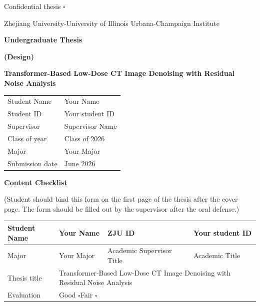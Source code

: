 \documentclass[12pt,a4paper]{report}
\newcommand{\ThesisTitle}{Transformer-Based Low-Dose CT Image Denoising with Residual Noise Analysis}
\newcommand{\StudentName}{Your Name}
\newcommand{\StudentID}{Your student ID}
\newcommand{\SupervisorName}{Supervisor Name}
\newcommand{\SupervisorTitle}{Academic Title}
\newcommand{\ClassYear}{Class of 2026}
\newcommand{\Major}{Your Major}
\newcommand{\SubmissionDate}{June 2026}
\newcommand{\fronttitle}[1]{%
  \clearpage
  \begin{center}
    {\bfseries\fontsize{24}{28}\selectfont #1}
  \end{center}
  \vspace{1em}
}
\begin{document}
\begin{titlepage}
\thispagestyle{empty}
\begin{flushright}
Confidential thesis $\square$
\end{flushright}
\vspace*{1.2cm}
\begin{center}
{\fontsize{18}{22}\selectfont Zhejiang University-University of Illinois Urbana-Champaign Institute\par}
\vspace{1.4cm}
{\bfseries\fontsize{24}{30}\selectfont Undergraduate Thesis\par}
\vspace{0.3cm}
{\bfseries\fontsize{20}{24}\selectfont (Design)\par}
\vspace{2.2cm}
{\bfseries\fontsize{20}{24}\selectfont \ThesisTitle\par}
\vfill
\renewcommand{\arraystretch}{1.6}
\begin{tabular}{>{\raggedleft\arraybackslash}p{} p{}}
Student Name & \StudentName\\
Student ID & \StudentID\\
Supervisor & \SupervisorName\\
Class of year & \ClassYear\\
Major & \Major\\
Submission date & \SubmissionDate\\
\end{tabular}
\end{center}
\end{titlepage}

\setcounter{page}{2}

\fronttitle{Content Checklist}

\begin{center}
\small
(Student should bind this form on the first page of the thesis after the cover page. The form should be filled out by the supervisor after the oral defense.)
\end{center}
\vspace{0.5em}

\renewcommand{\arraystretch}{1.35}
\begin{tabularx}{\textwidth}{|p{}|X|p{}|X|}
\hline
Student Name & \StudentName & ZJU ID & \StudentID\\ \hline
Major & \Major & Academic Supervisor Title & \SupervisorTitle\\ \hline
Thesis title & \multicolumn{3}{p{0.69\textwidth}|}{\ThesisTitle}\\ \hline
Evaluation & \multicolumn{3}{p{0.69\textwidth}|}{Good $\square$\quad Fair $\square$}\\ \hline
\end{tabularx}
\end{document}
